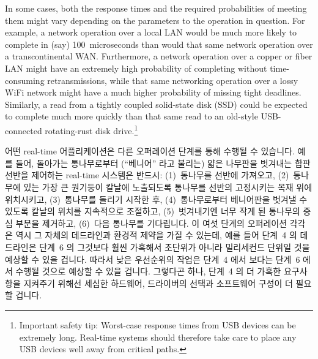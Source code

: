 In some cases, both the response times and the required probabilities of
meeting them might vary depending on the parameters to the operation in
question.
For example, a network operation over a local LAN would be much more likely
to complete in (say) 100~microseconds than would that same network operation
over a transcontinental WAN.
Furthermore, a network operation over a copper or fiber
LAN might have an extremely
high probability of completing without time-consuming retransmissions,
while that same networking operation over a lossy WiFi network might
have a much higher probability of missing tight deadlines.
Similarly, a read from a tightly coupled solid-state disk (SSD) could be
expected to complete much more quickly than that same read to an old-style
USB-connected rotating-rust disk drive.\footnote{
	Important safety tip:  Worst-case response times from USB devices
	can be extremely long.
	Real-time systems should therefore take care to place any USB
	devices well away from critical paths.}
\fi

어떤 real-time 어플리케이션은 다른 오퍼레이션 단계를 통해 수행될 수 있습니다.
예를 들어, 돌아가는 통나무로부터 (``베니어'' 라고 불리는) 얇은 나무판을
벗겨내는 합판 선반을 제어하는 real-time 시스템은 반드시:
(1)~통나무를 선반에 가져오고,
(2)~통나무에 있는 가장 큰 원기둥이 칼날에 노출되도록 통나무를 선반의 고정시키는
목재 위에 위치시키고,
(3)~통나무를 돌리기 시작한 후,
(4)~통나무로부터 베니어판을 벗겨낼 수 있도록 칼날의 위치를 지속적으로 조절하고,
(5)~벗겨내기엔 너무 작게 된 통나무의 중심 부분을 제거하고,
(6)~다음 통나무를 기다립니다.
이 여섯 단계의 오퍼레이션 각각은 역시 그 자체의 데드라인과 환경적 제약을 가질
수 있는데, 예를 들어 단계~4 의 데드라인은 단계~6 의 그것보다 훨씬 가혹해서
초단위가 아니라 밀리세컨드 단위일 것을 예상할 수 있을 겁니다.
따라서 낮은 우선순위의 작업은 단계~4 에서 보다는 단계~6 에서 수행될 것으로
예상할 수 있을 겁니다.
그렇다곤 하나, 단계~4 의 더 가혹한 요구사항을 지켜주기 위해선 세심한 하드웨어,
드라이버의 선택과 소프트웨어 구성이 더 필요할 겁니다.

